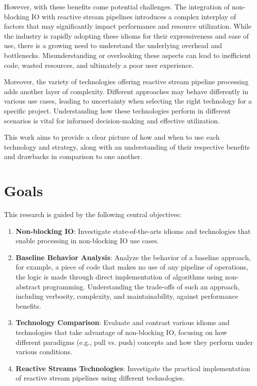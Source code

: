 However, with these benefits come potential challenges. The integration of non-blocking IO with reactive stream pipelines introduces a complex interplay of factors that may significantly impact performance and resource utilization. While the industry is rapidly adopting these idioms for their expressiveness and ease of use, there is a growing need to understand the underlying overhead and bottlenecks. Misunderstanding or overlooking these aspects can lead to inefficient code, wasted resources, and ultimately a poor user experience.

Moreover, the variety of technologies offering reactive stream pipeline processing adds another layer of complexity. Different approaches may behave differently in various use cases, leading to uncertainty when selecting the right technology for a specific project. Understanding how these technologies perform in different scenarios is vital for informed decision-making and effective utilization.

This work aims to provide a clear picture of how and when to use each technology and strategy, along with an understanding of their respective benefits and drawbacks in comparison to one another.


\section{Goals}
\label{sec:goals}
This research is guided by the following central objectives:

\begin{enumerate}
\item \textbf{Non-blocking IO}: Investigate state-of-the-arts idioms and technologies that enable processing in non-blocking IO use cases.

\item \textbf{Baseline Behavior Analysis}: Analyze the behavior of a baseline approach, for example, a piece of code that makes no use of any pipeline of operations, the logic is made through direct implementation of algorithms using non-abstract programming. Understanding the trade-offs of such an approach, including verbosity, complexity, and maintainability, against performance benefits.

\item \textbf{Technology Comparison}: Evaluate and contrast various idioms and technologies that take advantage of non-blocking IO, focusing on how different paradigms (e.g., pull vs. push) concepts and how they perform under various conditions.

\item \textbf{Reactive Streams Technologies}: Investigate the practical implementation of reactive stream pipelines using different technologies.

\end{enumerate}

